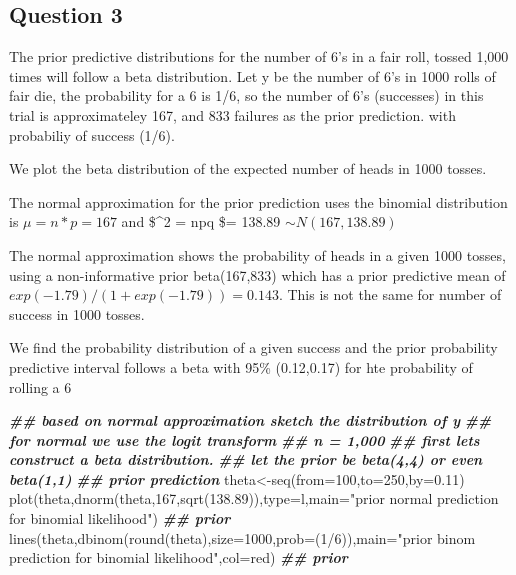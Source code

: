 \documentclass[
]{book}
\newenvironment{Shaded}{\begin{snugshade}}{\end{snugshade}}
\newcommand{\AttributeTok}[1]{\textcolor[rgb]{0.77,0.63,0.00}{#1}}
\newcommand{\DecValTok}[1]{\textcolor[rgb]{0.00,0.00,0.81}{#1}}
\newcommand{\DocumentationTok}[1]{\textcolor[rgb]{0.56,0.35,0.01}{\textbf{\textit{#1}}}}
\newcommand{\FloatTok}[1]{\textcolor[rgb]{0.00,0.00,0.81}{#1}}
\newcommand{\FunctionTok}[1]{\textcolor[rgb]{0.00,0.00,0.00}{#1}}
\newcommand{\NormalTok}[1]{#1}
\newcommand{\OtherTok}[1]{\textcolor[rgb]{0.56,0.35,0.01}{#1}}
\newcommand{\SpecialCharTok}[1]{\textcolor[rgb]{0.00,0.00,0.00}{#1}}
\newcommand{\StringTok}[1]{\textcolor[rgb]{0.31,0.60,0.02}{#1}}
\theoremstyle{definition}
\theoremstyle{definition}
\theoremstyle{definition}
\theoremstyle{definition}
\theoremstyle{remark}
\begin{document}
\hypertarget{question-3}{%
\subsection*{Question 3}\label{question-3}}

The prior predictive distributions for the number of 6's in a fair roll, tossed 1,000 times will follow a beta distribution. Let y be the number of 6's in 1000 rolls of fair die, the probability for a 6 is 1/6, so the number of 6's (successes) in this trial is approximateley 167, and 833 failures as the prior prediction. with probabiliy of success (1/6).

We plot the beta distribution of the expected number of heads in 1000 tosses.

The normal approximation for the prior prediction uses the binomial distribution is \(\mu = n*p = 167\) and \$\sigma\^{}2 = npq \$= 138.89 \(\sim N(167, 138.89)\)

The normal approximation shows the probability of heads in a given 1000 tosses, using a non-informative prior beta(167,833) which has a prior predictive mean of \(exp(-1.79)/(1+exp(-1.79)) = 0.143\). This is not the same for number of success in 1000 tosses.

We find the probability distribution of a given success and the prior probability predictive interval follows a beta with 95\% (0.12,0.17) for hte probability of rolling a 6

\begin{Shaded}
\begin{Highlighting}[]
  \DocumentationTok{\#\# based on normal approximation sketch the distribution of y}
  \DocumentationTok{\#\# for normal we use the logit transform}
  \DocumentationTok{\#\# n = 1,000}
  \DocumentationTok{\#\# first lets construct a beta distribution.}
  \DocumentationTok{\#\# let the prior be beta(4,4) or even beta(1,1)}
\DocumentationTok{\#\# prior prediction}
\NormalTok{  theta}\OtherTok{\textless{}{-}}\FunctionTok{seq}\NormalTok{(}\AttributeTok{from=}\DecValTok{100}\NormalTok{,}\AttributeTok{to=}\DecValTok{250}\NormalTok{,}\AttributeTok{by=}\FloatTok{0.11}\NormalTok{)}
     \FunctionTok{plot}\NormalTok{(theta,}\FunctionTok{dnorm}\NormalTok{(theta,}\DecValTok{167}\NormalTok{,}\FunctionTok{sqrt}\NormalTok{(}\FloatTok{138.89}\NormalTok{)),}\AttributeTok{type=}\StringTok{\textquotesingle{}l\textquotesingle{}}\NormalTok{,}\AttributeTok{main=}\StringTok{"prior normal prediction for binomial likelihood"}\NormalTok{) }\DocumentationTok{\#\# prior}
     \FunctionTok{lines}\NormalTok{(theta,}\FunctionTok{dbinom}\NormalTok{(}\FunctionTok{round}\NormalTok{(theta),}\AttributeTok{size=}\DecValTok{1000}\NormalTok{,}\AttributeTok{prob=}\NormalTok{(}\DecValTok{1}\SpecialCharTok{/}\DecValTok{6}\NormalTok{)),}\AttributeTok{main=}\StringTok{"prior binom prediction for binomial likelihood"}\NormalTok{,}\AttributeTok{col=}\StringTok{\textquotesingle{}red\textquotesingle{}}\NormalTok{) }\DocumentationTok{\#\# prior}
\end{Highlighting}
\end{Shaded}
\end{document}

